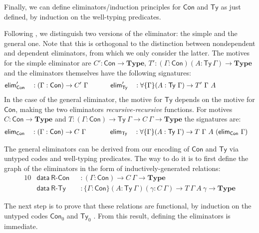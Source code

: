 \documentclass[autoref]{llncs}
\newcommand{\GG}{\Gamma}
\newcommand{\mType}{\mathbf{Type}}
\begin{document}
Finally, we can define eliminators/induction principles for $\textsf{Con}$ and
$\textsf{Ty}$ as just defined, by induction on the well-typing predicates.

Following \cite{ii}, we distinguish two versions of the eliminator:
the simple and the general one. Note that this is orthogonal to the
distinction between nondependent and dependent eliminators, from which
we only consider the latter. The motives for the simple eliminator are
$C':\textsf{Con}\to\mType$,
$T':(\GG:\textsf{Con})(A:\textsf{Ty}\,\GG)\to \mType$ and the
eliminators themselves have the following signatures:
\begin{alignat*}{10}
  & \textsf{elim}_{\textsf{Con}}' && : (\GG : \textsf{Con}) \to C'\ \GG \hspace{3.3em} \textsf{elim}_{\textsf{Ty}}' && : \forall\{\GG\} (A : \textsf{Ty}\ \GG) \to T'\ \GG\ A \hphantom{(\textsf{elim}_{\textsf{Con}}\ \GG)}
\end{alignat*}
In the case of the general eliminator, the motive for $\textsf{Ty}$
depends on the motive for $\textsf{Con}$, making the two eliminators
\emph{recursive-recursive} functions. For motives $C :
\textsf{Con} \to \mType$ and $T : (\GG : \textsf{Con}) \to
\textsf{Ty}\ \GG \to C\ \GG \to \mType$ the signatures are:
\begin{alignat*}{10}
  & \textsf{elim}_{\textsf{Con}} && : (\GG : \textsf{Con}) \to C\ \GG \hphantom{'}\hspace{3.3em} \textsf{elim}_{\textsf{Ty}} && : \forall\{\GG\} (A : \textsf{Ty}\ \GG) \to T\ \GG\ A\ (\textsf{elim}_{\textsf{Con}}\ \GG)
\end{alignat*}

The general eliminators can be derived from our encoding of $\textsf{Con}$ and $\textsf{Ty}$ via
untyped codes and well-typing predicates. The way to do it is to first define
the graph of the eliminators in the form of inductively-generated relations:
\begin{alignat*}{10}
  & \textsf{data}\ \textsf{R-Con} && :
    (\GG : \textsf{Con}) \to C\ \GG \to \mType \\
  & \textsf{data}\ \textsf{R-Ty} && : \{\GG : \textsf{Con}\} (A : \textsf{Ty}\ \GG)
  (\gamma : C\ \GG)
  \to T\ \GG\ A\ \gamma
  \to \mType
\end{alignat*}

The next step is to prove that these relations are functional, by induction on
the untyped codes $\textsf{Con}_0$ and $\textsf{Ty}_0$ \cite{induction-is-enough}. From this result,
defining the eliminators is immediate.
\end{document}
